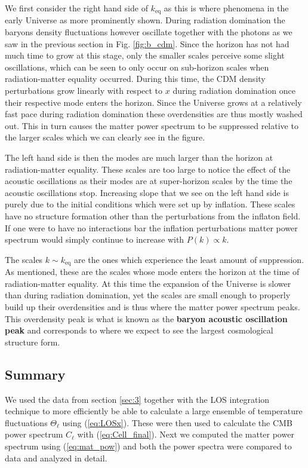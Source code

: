 \documentclass[%
reprint,
 amsmath,amssymb,
 aps,
]{revtex4-2}
\begin{document}
We first consider the right hand side of $k_\text{eq}$ as this is where phenomena in the early Universe as more prominently shown. During radiation domination the baryons density fluctuations however oscillate together with the photons as we saw in the previous section in Fig. \ref{fig:b_cdm}. Since the horizon has not had much time to grow at this stage, only the smaller scales perceive some slight oscillations, which can be seen to only occur on sub-horizon scales when radiation-matter equality occurred. During this time, the CDM density perturbations grow linearly with respect to $x$ during radiation domination once their respective mode enters the horizon. Since the Universe grows at a relatively fast pace during radiation domination these overdensities are thus mostly washed out. This in turn causes the matter power spectrum to be suppressed relative to the larger scales which we can clearly see in the figure.

The left hand side is then the modes are much larger than the horizon at radiation-matter equality. These scales are too large to notice the effect of the acoustic oscillations as their modes are at super-horizon scales by the time the acoustic oscillations stop. Increasing slope that we see on the left hand side is purely due to the initial conditions which were set up by inflation. These scales have no structure formation other than the perturbations from the inflaton field. If one were to have no interactions bar the inflation perturbations matter power spectrum would simply continue to increase with $P(k)\propto k$.

The scales $k\sim k_\text{eq}$ are the ones which experience the least amount of suppression. As mentioned, these are the scales whose mode enters the horizon at the time of radiation-matter equality. At this time the expansion of the Universe is slower than during radiation domination, yet the scales are small enough to properly build up their overdensities and is thus where the matter power spectrum peaks. This overdensity peak is what is known as the \textbf{baryon acoustic oscillation peak} and corresponds to where we expect to see the largest cosmological structure form.

\subsection{Summary}
We used the data from section \ref{sec:3} together with the LOS integration technique to more efficiently be able to calculate a large ensemble of temperature fluctuations $\Theta_\ell$ using (\ref{eq:LOSx}). These were then used to calculate the CMB power spectrum $C_\ell$ with (\ref{eq:Cell_final}). Next we computed the matter power spectrum using (\ref{eq:mat_pow}) and both the power spectra were compared to data and analyzed in detail.
\end{document}
